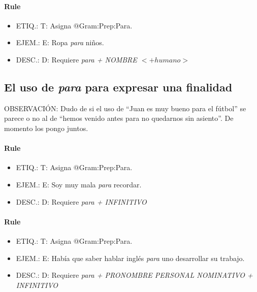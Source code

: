 \documentclass[11pt]{report}
\begin{document}
\paragraph*{Rule}
\begin{itemize}
\item ETIQ.:  T: Asigna @Gram:Prep:Para.
\item EJEM.:  E: Ropa \emph{para} niños.
\item DESC.:  D: Requiere \emph{para + NOMBRE $<+humano>$}
\end{itemize}

\subsection{El uso de \emph{para} para expresar una finalidad}
OBSERVACIÓN: Dudo de si el uso de ``Juan es muy bueno para el fútbol'' se parece o no al de ``hemos venido antes para no quedarnos sin asiento''. De momento los pongo juntos.

\paragraph*{Rule}
\begin{itemize}
\item ETIQ.:  T: Asigna @Gram:Prep:Para.
\item EJEM.:  E: Soy muy mala \emph{para} recordar.
\item DESC.:  D: Requiere \emph{para + INFINITIVO}
\end{itemize}

\paragraph*{Rule}
\begin{itemize}
\item ETIQ.:  T: Asigna @Gram:Prep:Para.
\item EJEM.:  E: Había que saber hablar inglés \emph{para} uno desarrollar su trabajo.
\item DESC.:  D: Requiere \emph{para + PRONOMBRE PERSONAL NOMINATIVO + INFINITIVO}
\end{itemize}
\end{document}

